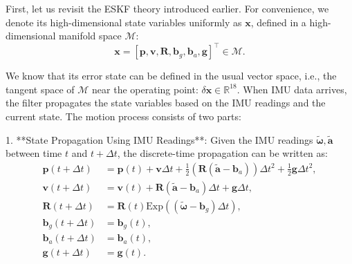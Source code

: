 First, let us revisit the ESKF theory introduced earlier. For convenience, we denote its high-dimensional state variables uniformly as $\bm{x}$, defined in a high-dimensional manifold space $\mathcal{M}$:  
\begin{equation}\label{eq:def-of-state-variable}  
	\bm{x} = [\bm{p}, \bm{v}, \bm{R}, \bm{b}_g, \bm{b}_a, \bm{g}]^\top \in \mathcal{M}.  
\end{equation}  

We know that its error state can be defined in the usual vector space, i.e., the tangent space of $\mathcal{M}$ near the operating point: $\delta \bm{x} \in \mathbb{R}^{18}$. When IMU data arrives, the filter propagates the state variables based on the IMU readings and the current state. The motion process consists of two parts:  

1. **State Propagation Using IMU Readings**: Given the IMU readings $\tilde{\boldsymbol{\omega}}, \tilde{\bm{a}}$ between time $t$ and $t+\Delta t$, the discrete-time propagation can be written as:  
\begin{subequations}\label{key}  
	\begin{align}  
		\bm{p}(t+\Delta t) &= \bm{p}(t) + \bm{v} \Delta t + \frac{1}{2}   
		\left(\bm{R}(\tilde{\bm{a}}-\bm{b}_a) \right) \Delta t^2 + \frac{1}{2} \bm{g} \Delta t^2, \\  
		\bm{v}(t+\Delta t) &= \bm{v}(t) + \bm{R} (\tilde{\bm{a}} - \bm{b}_a) \Delta t + \bm{g} \Delta t, \\  
		\bm{R}(t+\Delta t) &= \bm{R}(t) \mathrm{Exp} \left( (\tilde{\boldsymbol{\omega}}-\bm{b}_g)   
		\Delta t \right), \\  
		\bm{b}_g(t+\Delta t) &= \bm{b}_g(t), \\  
		\bm{b}_a(t+\Delta t) &= \bm{b}_a(t), \\  
		\bm{g}(t+\Delta t) &= \bm{g}(t) .  
	\end{align}  
\end{subequations}  

